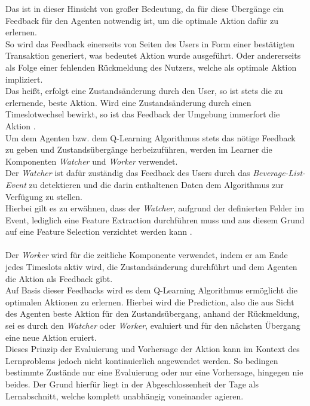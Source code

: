 Das ist in dieser Hinsicht von großer Bedeutung, da für diese Übergänge ein Feedback für den Agenten notwendig ist, um die optimale Aktion dafür zu erlernen. \\
So wird das Feedback einerseits von Seiten des Users in Form einer bestätigten Transaktion generiert, was bedeutet Aktion  wurde ausgeführt. Oder andererseits als Folge einer fehlenden Rückmeldung des Nutzers, welche  als optimale Aktion impliziert. \\
Das heißt, erfolgt eine Zustandsänderung durch den User, so ist stets  die zu erlernende, beste Aktion. Wird eine Zustandsänderung durch einen Timeslotwechsel bewirkt, so ist das Feedback der Umgebung immerfort die Aktion . \\
Um dem Agenten bzw. dem Q-Learning Algorithmus stets das nötige Feedback zu geben und Zustandsübergänge herbeizuführen, werden im Learner die Komponenten \textit{Watcher} und \textit{Worker} verwendet. \\
Der \textit{Watcher} ist dafür zuständig das Feedback des Users durch das \textit{Beverage-List-Event} zu detektieren und die darin enthaltenen Daten dem Algorithmus zur Verfügung zu stellen. \\
Hierbei gilt es zu erwähnen, dass der \textit{Watcher}, aufgrund der definierten Felder im Event, lediglich eine Feature Extraction durchführen muss und aus diesem Grund auf eine Feature Selection verzichtet werden kann \cite{fteng}.\\\\ 
Der \textit{Worker} wird für die zeitliche Komponente verwendet, indem er am Ende jedes Timeslots aktiv wird, die Zustandsänderung durchführt und dem Agenten die Aktion  als Feedback gibt. \\
Auf Basis dieser Feedbacks wird es dem Q-Learning Algorithmus ermöglicht die optimalen Aktionen zu erlernen. Hierbei wird die Prediction, also die aus Sicht des Agenten beste Aktion für den Zustandsübergang, anhand der Rückmeldung, sei es durch den \textit{Watcher} oder \textit{Worker}, evaluiert und für den nächsten Übergang eine neue Aktion eruiert. \\
Dieses Prinzip der Evaluierung und Vorhersage der Aktion kann im Kontext des Lernproblems jedoch nicht kontinuierlich angewendet werden. 
So bedingen bestimmte Zustände nur eine Evaluierung oder nur eine Vorhersage, hingegen nie beides. Der Grund hierfür liegt in der Abgeschlossenheit der Tage als Lernabschnitt, welche komplett unabhängig voneinander agieren. \\
